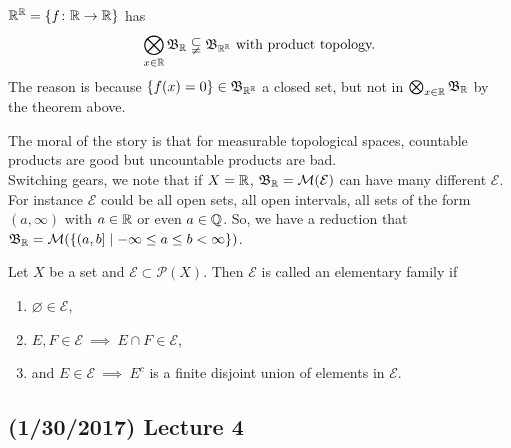 \documentclass[11pt,leqno,oneside]{amsbook}
\numberwithin{thm}{section}
\renewcommand{\P}{\mathcal{P}}
\newcommand{\M}{\mathcal{M}}
\newcommand{\Ep}{\mathcal{E}}
\begin{document}
\begin{example}
  ${\mathbb R}^{\mathbb R} = \{f\colon  {\mathbb R} \to {\mathbb R}\}$ has \[
    \bigotimes_{x \in {\mathbb R}} \mathfrak{B}_{\mathbb R} \subsetneqq \mathfrak{B}_{{\mathbb R}^{\mathbb R}} \text{ with
      product topology.}
  \]
  The reason is because $\{f(x) = 0\} \in \mathfrak{B}_{{\mathbb R}^{\mathbb R}}$ a closed set,
  but not in $\bigotimes_{x \in {\mathbb R}} \mathfrak{B}_{\mathbb R}$ by the theorem above.
\end{example}
The moral of the story is that for measurable topological spaces,
countable products are good but uncountable products are bad. \\

Switching gears, we note that if $X = {\mathbb R}$, $\B_\R = \M(\Ep)$ can have
many different $\Ep$. For instance $\Ep$ could be all open sets, all
open intervals, all sets of the form $(a, \infty)$ with $a \in {\mathbb R}$ or
even $a \in {\mathbb Q}$. So, we have a reduction that $\B_\R = \M(\{(a,b] \mid
-\infty \leq a \leq b < \infty\})$.
\begin{defn}
  Let $X$ be a set and $\Ep \subset \P(X)$. Then $\Ep$ is called an
  elementary family if
  \begin{enumerate}
  \item $\varnothing \in \Ep$,
  \item $E,F \in \Ep \ \implies \ E \cap F \in \Ep$,
  \item and $E \in \Ep \ \implies \ E^c$ is a finite disjoint union of
    elements in $\Ep$.
  \end{enumerate}
\end{defn}
\subsection*{(1/30/2017) Lecture 4}
\end{document}
